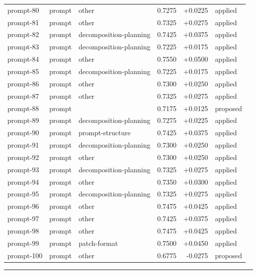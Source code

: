 \begin{center}
\begin{longtable}{llp{5.2cm}rrl}
prompt-80 & prompt & other & 0.7275 & +0.0225 & applied \\
prompt-81 & prompt & other & 0.7325 & +0.0275 & applied \\
prompt-82 & prompt & decomposition-planning & 0.7425 & +0.0375 & applied \\
prompt-83 & prompt & decomposition-planning & 0.7225 & +0.0175 & applied \\
prompt-84 & prompt & other & 0.7550 & +0.0500 & applied \\
prompt-85 & prompt & decomposition-planning & 0.7225 & +0.0175 & applied \\
prompt-86 & prompt & other & 0.7300 & +0.0250 & applied \\
prompt-87 & prompt & other & 0.7325 & +0.0275 & applied \\
prompt-88 & prompt &  & 0.7175 & +0.0125 & proposed \\
prompt-89 & prompt & decomposition-planning & 0.7275 & +0.0225 & applied \\
prompt-90 & prompt & prompt-structure & 0.7425 & +0.0375 & applied \\
prompt-91 & prompt & decomposition-planning & 0.7300 & +0.0250 & applied \\
prompt-92 & prompt & other & 0.7300 & +0.0250 & applied \\
prompt-93 & prompt & decomposition-planning & 0.7325 & +0.0275 & applied \\
prompt-94 & prompt & other & 0.7350 & +0.0300 & applied \\
prompt-95 & prompt & decomposition-planning & 0.7325 & +0.0275 & applied \\
prompt-96 & prompt & other & 0.7475 & +0.0425 & applied \\
prompt-97 & prompt & other & 0.7425 & +0.0375 & applied \\
prompt-98 & prompt & other & 0.7475 & +0.0425 & applied \\
prompt-99 & prompt & patch-format & 0.7500 & +0.0450 & applied \\
prompt-100 & prompt & other & 0.6775 & -0.0275 & proposed \\
\bottomrule\end{longtable}\end{center}
\par\bigskip\hrule\bigskip
